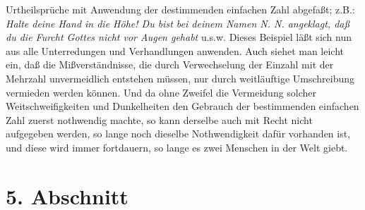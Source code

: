 Urtheilsprüche mit Anwendung der destimmenden einfachen Zahl abgefaßt; z.B.:
\textit{Halte deine Hand in die Höhe! Du bist bei deinem Namen N. N. angeklagt, daß du
die Furcht Gottes nicht vor Augen gehabt} u.s.w. Dieses Beispiel läßt sich nun
aus alle Unterredungen und Verhandlungen anwenden. Auch siehet man leicht ein,
daß die Mißverständnisse, die durch Verwechselung der Einzahl mit der Mehrzahl
unvermeidlich entstehen müssen, nur durch weitläuftige Umschreibung vermieden
werden können. Und da ohne Zweifel die Vermeidung solcher Weitschweifigkeiten
und Dunkelheiten den Gebrauch der bestimmenden einfachen Zahl zuerst nothwendig
machte, so kann derselbe auch mit Recht nicht aufgegeben werden, so lange noch
dieselbe Nothwendigkeit dafür vorhanden ist, und diese wird immer fortdauern, so
lange es zwei Menschen in der Welt giebt.

\section{5. Abschnitt} \label{kap10_ab5}

